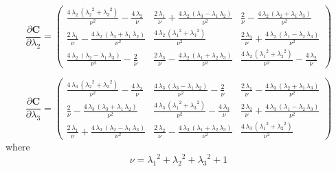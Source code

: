\begin{equation}
\frac{\partial \mathbf{C}}{\partial \lambda_2} = 
\left(\begin{array}{ccc} 
\frac{4\, {\lambda_2}\, \left({{\lambda_2}}^2 + {{\lambda_3}}^2\right)}{{\nu}^2} - \frac{4\, {\lambda_2}}{\nu} &
\frac{2\, {\lambda_1}}{\nu} + \frac{4\, {\lambda_2}\, \left({\lambda_3} - {\lambda_1}\, {\lambda_2}\right)}{{\nu}^2} &
\frac{2}{\nu} - \frac{4\, {\lambda_2}\, \left({\lambda_2} + {\lambda_1}\, {\lambda_3}\right)}{{\nu}^2}\\
\frac{2\, {\lambda_1}}{\nu} - \frac{4\, {\lambda_2}\, \left({\lambda_3} + {\lambda_1}\, {\lambda_2}\right)}{{\nu}^2} &
\frac{4\, {\lambda_2}\, \left({{\lambda_1}}^2 + {{\lambda_3}}^2\right)}{{\nu}^2} & \frac{2\, {\lambda_3}}{\nu} + \frac{4\, {\lambda_2}\, \left({\lambda_1} - {\lambda_2}\, {\lambda_3}\right)}{{\nu}^2}\\
\frac{4\, {\lambda_2}\, \left({\lambda_2} - {\lambda_1}\, {\lambda_3}\right)}{{\nu}^2} - \frac{2}{\nu} &
\frac{2\, {\lambda_3}}{\nu} - \frac{4\, {\lambda_2}\, \left({\lambda_1} + {\lambda_2}\, {\lambda_3}\right)}{{\nu}^2} &
\frac{4\, {\lambda_2}\, \left({{\lambda_1}}^2 + {{\lambda_2}}^2\right)}{{\nu}^2} - \frac{4\, {\lambda_2}}{\nu} \end{array}\right)
\end{equation}

\begin{equation}
\frac{\partial \mathbf{C}}{\partial \lambda_3} = 
\left(\begin{array}{ccc} \frac{4\, {\lambda_3}\, \left({{\lambda_2}}^2 + {{\lambda_3}}^2\right)}{{\nu}^2} - \frac{4\, {\lambda_3}}{\nu} & \frac{4\, {\lambda_3}\, \left({\lambda_3} - {\lambda_1}\, {\lambda_2}\right)}{{\nu}^2} - \frac{2}{\nu} & \frac{2\, {\lambda_1}}{\nu} - \frac{4\, {\lambda_3}\, \left({\lambda_2} + {\lambda_1}\, {\lambda_3}\right)}{{\nu}^2}\\ \frac{2}{\nu} - \frac{4\, {\lambda_3}\, \left({\lambda_3} + {\lambda_1}\, {\lambda_2}\right)}{{\nu}^2} & \frac{4\, {\lambda_3}\, \left({{\lambda_1}}^2 + {{\lambda_3}}^2\right)}{{\nu}^2} - \frac{4\, {\lambda_3}}{\nu} & \frac{2\, {\lambda_2}}{\nu} + \frac{4\, {\lambda_3}\, \left({\lambda_1} - {\lambda_2}\, {\lambda_3}\right)}{{\nu}^2}\\ \frac{2\, {\lambda_1}}{\nu} + \frac{4\, {\lambda_3}\, \left({\lambda_2} - {\lambda_1}\, {\lambda_3}\right)}{{\nu}^2} & \frac{2\, {\lambda_2}}{\nu} - \frac{4\, {\lambda_3}\, \left({\lambda_1} + {\lambda_2}\, {\lambda_3}\right)}{{\nu}^2} & \frac{4\, {\lambda_3}\, \left({{\lambda_1}}^2 + {{\lambda_2}}^2\right)}{{\nu}^2} \end{array}\right)
\end{equation}
where
\begin{equation}
\nu = {\lambda_1}^2 + {\lambda_2}^2 + {\lambda_3}^2 + 1
\end{equation}


